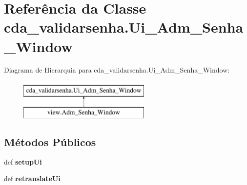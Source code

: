\hypertarget{classcda__validarsenha_1_1Ui__Adm__Senha__Window}{\section{\-Referência da \-Classe cda\-\_\-validarsenha.\-Ui\-\_\-\-Adm\-\_\-\-Senha\-\_\-\-Window}
\label{classcda__validarsenha_1_1Ui__Adm__Senha__Window}
}
\-Diagrama de \-Hierarquia para cda\-\_\-validarsenha.\-Ui\-\_\-\-Adm\-\_\-\-Senha\-\_\-\-Window\-:\begin{figure}[H]
\begin{center}
\leavevmode
\includegraphics[height=2.000000cm]{classcda__validarsenha_1_1Ui__Adm__Senha__Window}
\end{center}
\end{figure}
\subsection*{\-Métodos \-Públicos}
\begin{DoxyCompactItemize}
\item 
\hypertarget{classcda__validarsenha_1_1Ui__Adm__Senha__Window_a5c91f3c9d29045fe89d0b57172daff58}{def {\bfseries setup\-Ui}}\label{classcda__validarsenha_1_1Ui__Adm__Senha__Window_a5c91f3c9d29045fe89d0b57172daff58}

\item 
\hypertarget{classcda__validarsenha_1_1Ui__Adm__Senha__Window_a60a63843ed5e655b4ff036d5d789e25a}{def {\bfseries retranslate\-Ui}}\label{classcda__validarsenha_1_1Ui__Adm__Senha__Window_a60a63843ed5e655b4ff036d5d789e25a}

\end{DoxyCompactItemize}
